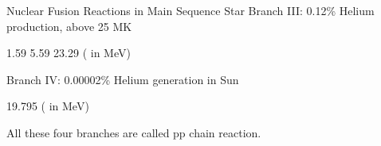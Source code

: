 \begin{notebox}[sharp corners, width=\textwidth]{Nuclear Fusion Reactions in Main Sequence Star}
\hspace{1cm} Branch III: 0.12\% Helium production, above 25 MK

\begin{center}
\end{center}
\vspace{-2mm}
	\hspace{3.8cm} 1.59 \hspace{0.6cm} 5.59 \hspace{2cm}     23.29   \hfill ( in MeV)


\hspace{1cm} Branch IV: 0.00002\% Helium generation in Sun 

\begin{center}
\end{center}
	\hspace{6cm} 19.795 \hspace{0.3cm}  \hfill ( in MeV)
	
{ \small All these four branches are called pp chain reaction.}
\end{notebox}
